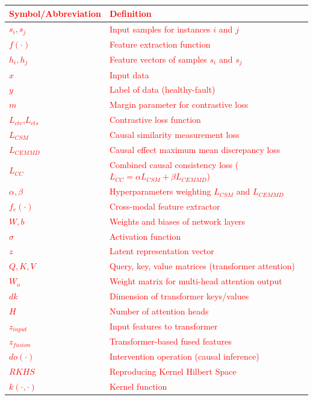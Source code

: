 \documentclass[preprint,12pt]{elsarticle}
\begin{document}
{\footnotesize %
\textcolor{red}{\begin{tabular}{lp{}}
\toprule
\textbf{Symbol/Abbreviation} & \textbf{Definition}\\
\midrule
$s_i, s_j$ & Input samples for instances $i$ and $j$ \\
$f(\cdot)$ & Feature extraction function\\
$h_i, h_j$ & Feature vectors of samples $s_i$ and $s_j$\\
$x$ & Input data\\
$y$ & Label of data (healthy-fault)\\
$m$ & Margin parameter for contrastive loss\\
$L_{ctv}$,$L_{cts}$ & Contrastive loss function\\
$L_{CSM}$ & Causal similarity measurement loss\\
$L_{CEMMD}$ & Causal effect maximum mean discrepancy loss\\
$L_{CC}$ & Combined causal consistency loss ($L_{CC}=\alpha L_{CSM}+\beta L_{CEMMD}$)\\
$\alpha,\beta$ & Hyperparameters weighting $L_{CSM}$ and $L_{CEMMD}$\\
$f_e(\cdot)$ & Cross-modal feature extractor\\
$W, b$ & Weights and biases of network layers\\
$\sigma$ & Activation function\\
$z$ & Latent representation vector\\
$Q, K, V$ & Query, key, value matrices (transformer attention)\\
$W_o$ & Weight matrix for multi-head attention output\\
$dk$ & Dimension of transformer keys/values\\
$H$ & Number of attention heads\\
$z_{input}$ & Input features to transformer\\
$z_{fusion}$ & Transformer-based fused features\\
$do(\cdot)$ & Intervention operation (causal inference)\\
$RKHS$ & Reproducing Kernel Hilbert Space\\
$k(\cdot,\cdot)$ & Kernel function\\
\bottomrule
\end{tabular}}
}

\vspace{0.5cm} %
\end{document}
